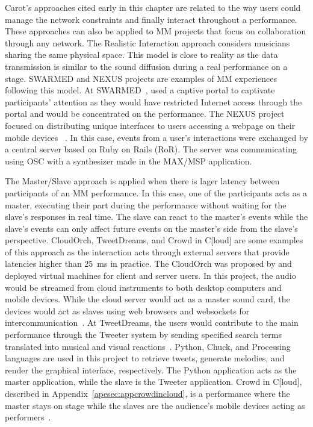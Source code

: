 Carot's approaches cited early in this chapter are related to the way users could manage the network constraints and finally interact throughout a performance.
These approaches can also be applied to MM projects that focus on collaboration through any network.
The Realistic Interaction approach considers musicians sharing the same physical space.
This model is close to reality as the data transmission is similar to the sound diffusion during a real performance on a stage.
SWARMED and NEXUS projects are examples of MM experiences following this model.
At SWARMED~\citep{Hindle2013swarmed},  used a captive portal to captivate participants' attention as they would have restricted Internet access through the portal and would be concentrated on the performance.
The NEXUS project focused on distributing unique interfaces to users accessing a webpage on their mobile devices~
\citep{Allison2013nexus}.
In this case, events from a user's interactions were exchanged by a central server based on Ruby on Rails (RoR).
The server was communicating using OSC with a synthesizer made in the MAX/MSP application.

The Master/Slave approach is applied when there is lager latency between participants of an MM performance.
In this case, one of the participants acts as a master, executing their part during the performance without waiting for the slave's responses in real time.
The slave can react to the master's events while the slave's events can only affect future events on the master's side from the slave's perspective.
CloudOrch, TweetDreams, and Crowd in C[loud] are some examples of this approach as the interaction acts through external servers that provide latencies higher than 25~ms in practice.
The CloudOrch was proposed by  and deployed virtual machines for client and server users.
In this project, the audio would be streamed from cloud instruments to both desktop computers and mobile devices.
While the cloud server would act as a master sound card, the devices would act as slaves using web browsers and websockets for intercommunication~\citep{Hindle2014cloudorch}.
At TweetDreams, the users would contribute to the main performance through the Tweeter system by sending specified search terms translated into musical and visual reactions~\citep{Dahl2011tweetdreams}.
Python, Chuck, and Processing languages are used in this project to retrieve tweets, generate melodies, and render the graphical interface, respectively.
The Python application acts as the master application, while the slave is the Tweeter application.
Crowd in C[loud], described in Appendix~\ref{apesec:appcrowdincloud}, is a performance where the master stays on stage while the slaves are the audience's mobile devices acting as performers~\citep{Lee2016crowd,deCarvalhoJunior2016understanding}.

